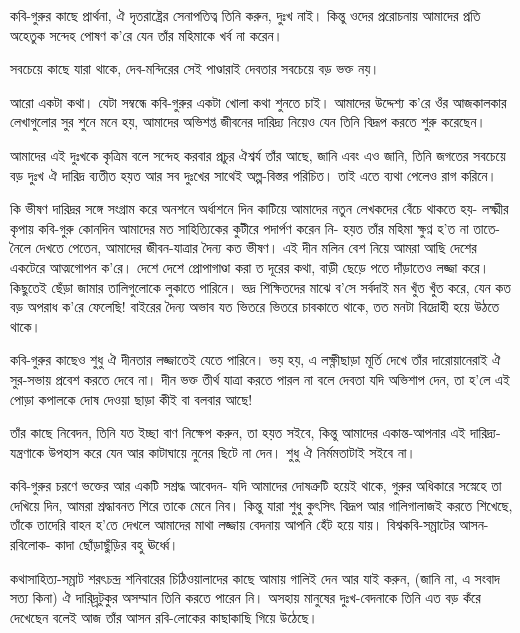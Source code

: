 \documentclass[a4paper,11pt]{article}
\begin{document}
\begin{multicols}{3}
{\begin{spacing}{1.15}
কবি-গুরুর কাছে প্রার্থনা, ঐ দৃতরাষ্ট্রের সেনাপতিত্ব তিনি করুন, দুঃখ নাই। কিন্তু ওদের প্ররোচনায় আমাদের প্রতি অহেতুক সন্দেহ পোষণ ক’রে যেন তাঁর মহিমাকে খর্ব না করেন।

সবচেয়ে কাছে যারা থাকে, দেব-মন্দিরের সেই পাণ্ডারাই দেবতার সবচেয়ে বড় ভক্ত নয়।

আরো একটা কথা। যেটা সম্বন্ধে কবি-গুরুর একটা খোলা কথা শুনতে চাই। আমাদের উদ্দেশ্য ক’রে ওঁর আজকালকার লেখাগুলোর সুর শুনে মনে হয়, আমাদের অভিশপ্ত জীবনের দারিদ্র্য নিয়েও যেন তিনি বিদ্রূপ করতে শুরু করেছেন।

আমাদের এই দুঃখকে কৃত্রিম বলে সন্দেহ করবার প্রচুর ঐশ্বর্য তাঁর আছে, জানি এবং এও জানি, তিনি জগতের সবচেয়ে বড় দুঃখ ঐ দারিদ্র ব্যতীত হয়ত আর সব দুঃখের সাথেই অল্প-বিস্তর পরিচিত। তাই এতে ব্যথা পেলেও রাগ করিনে।

কি ভীষণ দারিদ্রর সঙ্গে সংগ্রাম করে অনশনে অর্ধাশনে দিন কাটিয়ে আমাদের নতুন লেখকদের বেঁচে থাকতে হয়- লক্ষ্মীর কৃপায় কবি-গুরু কোনদিন আমাদের মত সাহিত্যিকের কুটীরে পদার্পণ করেন নি- হয়ত তাঁর মহিমা ক্ষুণ্ন হ’ত না তাতে- নৈলে দেখতে পেতেন, আমাদের জীবন-যাত্রার দৈন্য কত ভীষণ। এই দীন মলিন বেশ নিয়ে আমরা আছি দেশের একটেরে আত্মগোপন ক’রে। দেশে দেশে প্রোপাগাণ্ডা করা ত দূরের কথা, বাড়ী ছেড়ে পতে দাঁড়াতেও লজ্জা করে। কিছুতেই ছেঁড়া জামার তালিগুলোকে লুকাতে পারিনে। ভদ্র শিক্ষিতদের মাঝে ব’সে সর্বদাই মন খুঁত খুঁত করে, যেন কত বড় অপরাধ ক’রে ফেলেছি! বাইরের দৈন্য অভাব যত ভিতরে ভিতরে চাবকাতে থাকে, তত মনটা বিদ্রোহী হয়ে উঠতে থাকে।

কবি-গুরুর কাছেও শুধু ঐ দীনতার লজ্জাতেই যেতে পারিনে। ভয় হয়, এ লক্ষ্ণীছাড়া মূর্তি দেখে তাঁর দারোয়ানেরাই ঐ সুর-সভায় প্রবেশ করতে দেবে না। দীন ভক্ত তীর্থ যাত্রা করতে পারল না বলে দেবতা যদি অভিশাপ দেন, তা হ’লে এই পোড়া কপালকে দোষ দেওয়া ছাড়া কীই বা বলবার আছে!

তাঁর কাছে নিবেদন, তিনি যত ইচ্ছা বাণ নিক্ষেপ করুন, তা হয়ত সইবে, কিন্তু আমাদের একান্ত-আপনার এই দারিদ্র্য-যন্ত্রণাকে উপহাস করে যেন আর কাটাঘায়ে নুনের ছিটে না দেন। শুধু ঐ নির্মমতাটাই সইবে না।

কবি-গুরুর চরণে ভক্তের আর একটি সশ্রদ্ধ আবেদন- যদি আমাদের দোষত্রুটি হয়েই থাকে, গুরুর অধিকারে সস্নেহে তা দেখিয়ে দিন, আমরা শ্রদ্ধাবনত শিরে তাকে মেনে নিব। কিন্তু যারা শুধু কুৎসিৎ বিদ্রূপ আর গালিগালাজই করতে শিখেছে, তাঁকে তাদেরি বাহন হ’তে দেখলে আমাদের মাথা লজ্জায় বেদনায় আপনি হেঁট হয়ে যায়। বিশ্বকবি-সম্রাটের আসন-রবিলোক- কাদা ছোঁড়াছুঁড়ির বহু ঊর্ধ্বে।

কথাসাহিত্য-সম্রাট শরৎচন্দ্র শনিবারের চিঠিওয়ালাদের কাছে আমায় গালিই দেন আর যাই করুন, (জানি না, এ সংবাদ সত্য কিনা) ঐ দারিদ্র্রটুকুর অসম্মান তিনি করতে পারেন নি। অসহায় মানুষের দুঃখ-বেদনাকে তিনি এত বড় কঁরে দেখেছেন বলেই আজ তাঁর আসন রবি-লোকের কাছাকাছি গিয়ে উঠেছে।


\end{spacing}}
\end{multicols}
\end{document}
